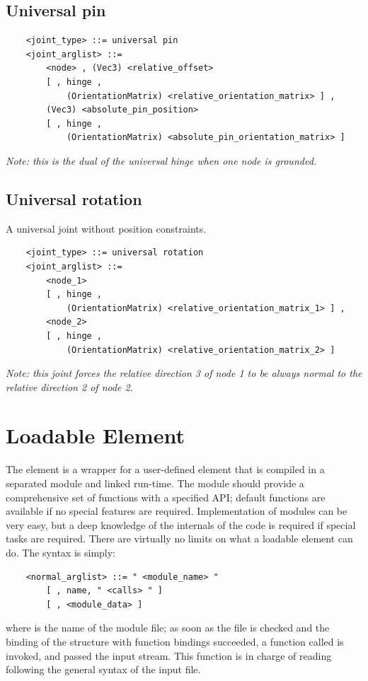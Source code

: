 \subsection{Universal pin}
\begin{verbatim}
    <joint_type> ::= universal pin
    <joint_arglist> ::= 
        <node> , (Vec3) <relative_offset>
        [ , hinge , 
            (OrientationMatrix) <relative_orientation_matrix> ] ,
        (Vec3) <absolute_pin_position>
        [ , hinge , 
            (OrientationMatrix) <absolute_pin_orientation_matrix> ]
\end{verbatim}
{\em
    Note: this is the dual of the universal hinge when one node is grounded.
}

\subsection{Universal rotation}
A universal joint without position constraints.
\begin{verbatim}
    <joint_type> ::= universal rotation
    <joint_arglist> ::= 
        <node_1>
        [ , hinge , 
            (OrientationMatrix) <relative_orientation_matrix_1> ] ,
        <node_2>
        [ , hinge , 
            (OrientationMatrix) <relative_orientation_matrix_2> ]
\end{verbatim}
{\em
    Note: this joint forces the relative direction 3 of node 1 to be always 
    normal to the relative direction 2 of node 2.
}


\section{Loadable Element}\label{sec:EL:BASE:LOADABLE}
The  element is a wrapper for a user-defined element that is
compiled in a separated module and linked run-time.
The module should provide a comprehensive set of functions with a specified
API; default functions are available if no special features are required.
Implementation of modules can be very easy, but a deep knowledge of the
internals of the code is required if special tasks are required. 
There are virtually no limits on what a loadable element can do.
The syntax is simply:
\begin{verbatim}
    <normal_arglist> ::= " <module_name> "
        [ , name, " <calls> " ] 
        [ , <module_data> ]
\end{verbatim}
where  is the name of the module file; as soon as the file
is checked and the binding of the structure with function bindings 
succeeded, a function called  is invoked, and passed the input
stream.
This function is in charge of reading  following the
general syntax of the input file.

